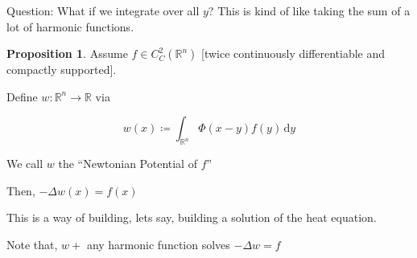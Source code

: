 \documentclass{article}
\theoremstyle{definition}
\newtheorem{proposition}{Proposition}
\begin{document}
Question: What if we integrate over all \(y\)? This is kind of like taking the sum of a lot of harmonic functions.

\begin{proposition}
    Assume \(f\in C^2_C (\mathbb{R} ^n)\) [twice continuously differentiable and compactly supported].

    Define \(w:\mathbb{R} ^n \to \mathbb{R} \) via

    \[
        w(x) \coloneqq \int_{\mathbb{R} ^n}^{} \Phi(x-y)f(y) \,\mathrm{d}y 
    \]

    We call \(w\) the ``Newtonian Potential of \(f\)''

    Then, \(-\Delta w(x) = f(x)\) 

\end{proposition}

This is a way of building, lets say, building a solution of the heat equation.

Note that, \(w +\) any harmonic function solves \(- \Delta w = f\) 
\end{document}
